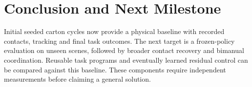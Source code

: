 \section{Conclusion and Next Milestone}
Initial seeded carton cycles now provide a physical baseline with recorded
contacts, tracking and final task outcomes. The next target is a frozen-policy
evaluation on unseen scenes, followed by broader contact recovery and bimanual
coordination. Reusable task programs and eventually learned residual control
can be compared against this baseline. These components require independent
measurements before claiming a general solution.

